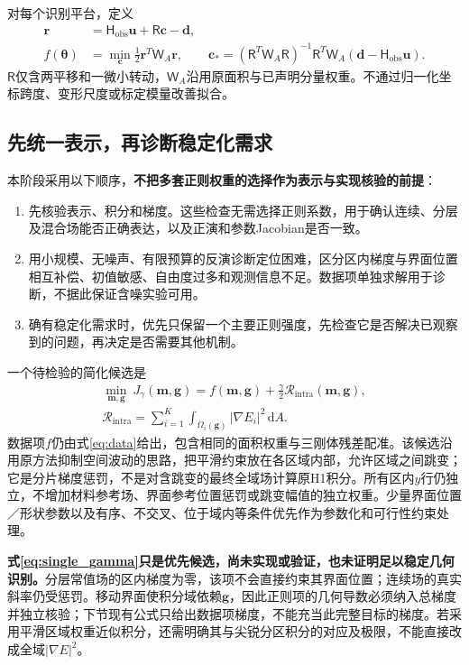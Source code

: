 \documentclass[11pt,a4paper]{ctexart}
\newcommand{\dd}{\,\mathrm d}
\newcommand{\obs}{\mathsf H_{\mathrm{obs}}}
\newcommand{\wa}{\mathsf W_A}
\newcommand{\btheta}{\boldsymbol\theta}
\begin{document}
对每个识别平台，定义
\begin{align}
 \mathbf r&=\obs\mathbf u+\mathsf R\mathbf c-\mathbf d,\\
 f(\btheta)&=\min_{\mathbf c}\tfrac12\mathbf r^T\wa\mathbf r,
 \qquad \mathbf c_*=(\mathsf R^T\wa\mathsf R)^{-1}
                  \mathsf R^T\wa(\mathbf d-\obs\mathbf u). \label{eq:data}
\end{align}
$\mathsf R$仅含两平移和一微小转动，$\wa$沿用原面积与已声明分量权重。不通过归一化坐标跨度、变形尺度或标定模量改善拟合。

\subsection{先统一表示，再诊断稳定化需求}
本阶段采用以下顺序，\textbf{不把多套正则权重的选择作为表示与实现核验的前提}：
\begin{enumerate}
\item 先核验表示、积分和梯度。这些检查无需选择正则系数，用于确认连续、分层及混合场能否正确表达，以及正演和参数Jacobian是否一致。
\item 用小规模、无噪声、有限预算的反演诊断定位困难，区分区内梯度与界面位置相互补偿、初值敏感、自由度过多和观测信息不足。数据项单独求解用于诊断，不据此保证含噪实验可用。
\item 确有稳定化需求时，优先只保留一个主要正则强度，先检查它是否解决已观察到的问题，再决定是否需要其他机制。
\end{enumerate}

一个待检验的简化候选是
\begin{equation}
 \boxed{\begin{aligned}
 \min_{\mathbf m,\mathbf g}\ J_\gamma(\mathbf m,\mathbf g)
 =f(\mathbf m,\mathbf g)
 +\frac{\gamma}{2}\mathcal R_{\mathrm{intra}}(\mathbf m,\mathbf g),
 \\
 \mathcal R_{\mathrm{intra}}=\sum_{i=1}^{K}
 \int_{\Omega_i(\mathbf g)}|\nabla E_i|^2\dd A.
 \end{aligned}}
 \label{eq:single_gamma}
\end{equation}
数据项$f$仍由式\eqref{eq:data}给出，包含相同的面积权重与三刚体残差配准。该候选沿用原方法抑制空间波动的思路，把平滑约束放在各区域内部，允许区域之间跳变；它是分片梯度惩罚，不是对含跳变的最终全域场计算原H1积分。所有区内$y$行仍独立，不增加材料参考场、界面参考位置惩罚或跳变幅值的独立权重。少量界面位置／形状参数以及有序、不交叉、位于域内等条件优先作为参数化和可行性约束处理。

\textbf{式\eqref{eq:single_gamma}只是优先候选，尚未实现或验证，也未证明足以稳定几何识别。}分层常值场的区内梯度为零，该项不会直接约束其界面位置；连续场的真实斜率仍受惩罚。移动界面使积分域依赖$\mathbf g$，因此正则项的几何导数必须纳入总梯度并独立核验；下节现有公式只给出数据项梯度，不能充当此完整目标的梯度。若采用平滑区域权重近似积分，还需明确其与尖锐分区积分的对应及极限，不能直接改成全域$|\nabla E|^2$。
\end{document}
